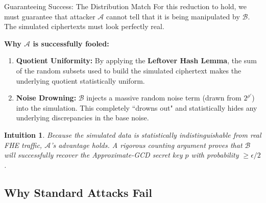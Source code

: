 \documentclass[10pt,handout]{beamer}
\newtheorem{intuition}{Intuition}
\begin{document}
\begin{frame}{Guaranteeing Success: The Distribution Match}
    For this reduction to hold, we must guarantee that attacker $\mathcal{A}$ cannot tell that it is being manipulated by $\mathcal{B}$. The simulated ciphertexts must look perfectly real.
    \pause
    
    \vspace{0.3cm}
    \textbf{Why $\mathcal{A}$ is successfully fooled:}
    \begin{enumerate}
        \item \textbf{Quotient Uniformity:} By applying the \textbf{Leftover Hash Lemma}, the sum of the random subsets used to build the simulated ciphertext makes the underlying quotient statistically uniform.
        \pause
        \item \textbf{Noise Drowning:} $\mathcal{B}$ injects a massive random noise term (drawn from $2^{\rho'}$) into the simulation. This completely ``drowns out" and statistically hides any underlying discrepancies in the base noise.
    \end{enumerate}
    \pause
    
    \vspace{0.3cm}
    \begin{intuition}
    Because the simulated data is statistically indistinguishable from real FHE traffic, $\mathcal{A}$'s advantage holds. A rigorous counting argument proves that $\mathcal{B}$ will successfully recover the Approximate-GCD secret key $p$ with probability $\ge \epsilon/2$.
    \end{intuition}
\end{frame}

\subsection{Why Standard Attacks Fail}
\end{document}
